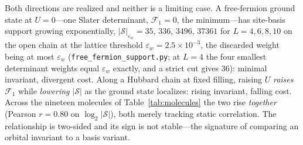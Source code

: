 Both directions are realized and neither is a limiting case. A free-fermion ground state at $U=0$---one
Slater determinant, $\mathcal F_1=0$, the minimum---has site-basis support growing exponentially,
$|\mathcal S|_{\varepsilon_w}=35,\,336,\,3496,\,37361$ for $L=4,6,8,10$ on the open chain at the lattice
threshold $\varepsilon_w=2.5\times10^{-3}$, the discarded weight being at most $\varepsilon_w$
(\texttt{free\_fermion\_support.py}; at $L=4$ the four smallest determinant weights equal
$\varepsilon_w$ exactly, and a strict cut gives $36$): minimal invariant, divergent cost. Along a
Hubbard chain at fixed filling, raising $U$ \emph{raises} $\mathcal F_1$ while \emph{lowering}
$|\mathcal S|$ as the ground state localizes: rising invariant, falling cost. Across the nineteen
molecules of Table~\ref{tab:molecules} the two rise \emph{together} (Pearson $r=0.80$ on
$\log_2|\mathcal S|$), both merely tracking static correlation. The relationship is two-sided and its sign
is not stable---the signature of comparing an orbital invariant to a basis variant.

